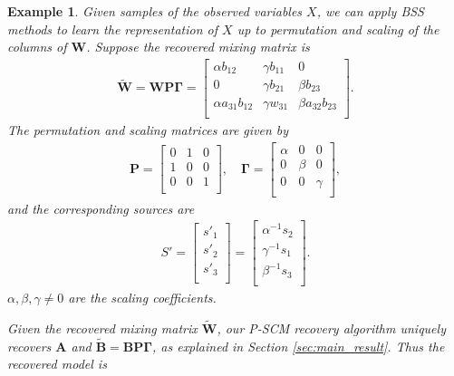 \documentclass[12pt]{article}
\newtheorem{example}{Example}
\newcommand{\bA}{\mathbf{A}}
\newcommand{\bB}{\mathbf{B}}
\newcommand{\bW}{\mathbf{W}}
\begin{document}
\begin{example}
Given samples of the observed variables $X$, we can apply BSS methods to learn the representation of $X$ up to permutation and scaling of the columns of $\bW$. Suppose the recovered mixing matrix is
\begin{align} \nonumber
\tilde{\bW} 
= \bW \mathbf{P} \mathbf{\Gamma}
=
\begin{bmatrix}
\alpha b_{12} & \gamma b_{11} & 0 \\
0 & \gamma b_{21} & \beta b_{23} \\
\alpha a_{31}b_{12} & \gamma w_{31} & \beta a_{32}b_{23} \\
\end{bmatrix}.
\end{align}
The permutation and scaling matrices are given by
\begin{align} \nonumber
\mathbf{P}
=
\begin{bmatrix}
0 & 1 & 0 \\
1 & 0 & 0 \\
0 & 0 & 1 \\
\end{bmatrix}
, \quad
\mathbf{\Gamma}
=
\begin{bmatrix}
\alpha & 0 & 0 \\
0 & \beta & 0 \\
0 & 0 & \gamma \\
\end{bmatrix}
,
\end{align}
and the corresponding sources are
\begin{align} \nonumber
S' = 
\begin{bmatrix}
s'_1 \\
s'_2 \\
s'_3 \\
\end{bmatrix}
=
\begin{bmatrix}
\alpha^{-1}s_2 \\
\gamma^{-1}s_1 \\
\beta^{-1}s_3 \\
\end{bmatrix}.
\label{eq:ex1_s_dash}
\end{align}
$\alpha, \beta, \gamma \neq 0$ are the scaling coefficients. 

Given the recovered mixing matrix $\tilde{\bW}$, our P-SCM recovery algorithm uniquely recovers $\bA$ and $\tilde{\bB}=\bB \mathbf{P} \mathbf{\Gamma}$, as explained in Section \ref{sec:main_result}. Thus the recovered model is 


\end{example}
\end{document}
